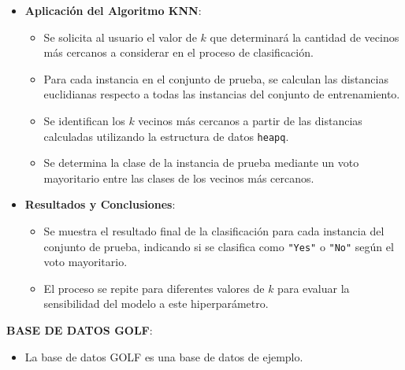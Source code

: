 \begin{enumerate}
\begin{itemize}
        \item \textbf{Aplicación del Algoritmo KNN}:
        \begin{itemize}
            \item Se solicita al usuario el valor de $k$ que determinará la cantidad de vecinos más cercanos a considerar en el proceso de clasificación.
            \item Para cada instancia en el conjunto de prueba, se calculan las distancias euclidianas respecto a todas las instancias del conjunto de entrenamiento.
            \item Se identifican los $k$ vecinos más cercanos a partir de las distancias calculadas utilizando la estructura de datos \texttt{heapq}.
            \item Se determina la clase de la instancia de prueba mediante un voto mayoritario entre las clases de los vecinos más cercanos.
        \end{itemize}

        \item \textbf{Resultados y Conclusiones}:
        \begin{itemize}
            \item Se muestra el resultado final de la clasificación para cada instancia del conjunto de prueba, indicando si se clasifica como \texttt{"Yes"} o \texttt{"No"} según el voto mayoritario.
            \item El proceso se repite para diferentes valores de $k$ para evaluar la sensibilidad del modelo a este hiperparámetro.
        \end{itemize}

    \end{itemize}
\end{enumerate}
\textbf{BASE DE DATOS GOLF}:
\begin{itemize}
    \item La base de datos GOLF es una base de datos de ejemplo.
\end{itemize}
